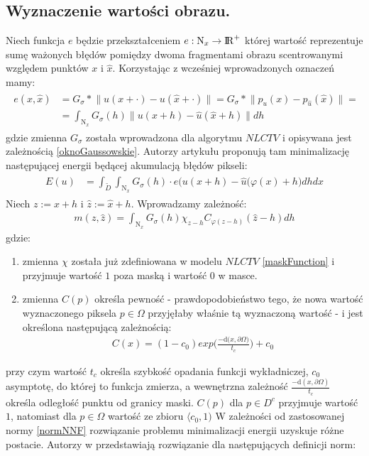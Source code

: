 \documentclass[12pt, twoside, openany]{report}
\theoremstyle{definition}
\begin{document}
\subsection{Wyznaczenie wartości obrazu.}
Niech funkcja $e$  będzie przekształceniem $e: \mathrm{N}_x \rightarrow {\rm I\!R}^{+}$ której wartość reprezentuje sumę ważonych błędów pomiędzy dwoma fragmentami obrazu scentrowanymi względem punktów $x$ i $\hat{x}$. Korzystając z wcześniej wprowadzonych oznaczeń mamy:
\begin{align}
\begin{aligned}
e(x, \hat{x}) &= G_\sigma \ast \big\| u(x + \cdot) - u(\hat{x} + \cdot) \big\| = G_\sigma \ast \big\| p_{u}(x) - p_{\hat{u}}(\hat{x}) \big\| = \\ 
&= \int_{\mathrm{N}_x} G_\sigma(h) \big\| u(x+h) - \hat{u}(\hat{x} +h) \big\|dh
\label{minUs}
\end{aligned}
\end{align}
gdzie zmienna $G_{\sigma}$ została wprowadzona dla algorytmu $NLCTV$ i opisywana jest zależnością \eqref{oknoGaussowskie}. Autorzy artykułu \cite{arias2011variational} proponują tam minimalizację następującej energii będącej akumulacją błędów pikseli:
\begin{align}
\begin{aligned}
E(u) &= \int_{\widetilde D}\int_{\mathrm{N}_x}G_\sigma(h)\cdot e \bigl( u(x+h) - \hat{u}(\varphi(x)+h\bigr)dhdx
\label{patchMatchEnergy}
\end{aligned}
\end{align} 
Niech $z := x+h$ i $\hat{z} := \hat{x}+h$. Wprowadzamy zależność:
\begin{align}
m(z,\hat{z}) = \int_{\mathrm{N}_x}G_\sigma(h)\chi_{z-h}C_{\varphi(z-h)}(\hat{z}-h)dh
\end{align}
gdzie:
\begin{enumerate}
\item
zmienna $\chi$ została już zdefiniowana w modelu $NLCTV$ \eqref{maskFunction} i przyjmuje wartość $1$ poza maską i wartość $0$ w masce.
\item
zmienna $C(p)$ określa pewność - prawdopodobieństwo tego, że nowa wartość wyznaczonego piksela $p \in \Omega$ przyjęłaby właśnie tą wyznaczoną wartość - i jest określona następującą zależnością:
\begin{align}
C(x)=(1-c_0)exp\bigg(\frac{-\mathrm{d}\bigl(x,\partial\Omega\bigr)}{t_c}\bigg) + c_0
\label{pewnoscVFI}
\end{align}
\end{enumerate}
przy czym wartość $t_c$ określa szybkość opadania funkcji wykładniczej, $c_0$ asymptotę, do której to funkcja zmierza, a wewnętrzna zależność $\frac{-\mathrm{d}(x,\partial\Omega)}{t_c}$ określa odległość punktu od granicy maski. $C(p)$ dla $p \in D^c$ przyjmuje wartość $1$, natomiast dla $p \in \Omega$ wartość ze zbioru $\langle c_0,1)$ W zależności od zastosowanej normy \eqref{normNNF} rozwiązanie problemu minimalizacji energii uzyskuje różne postacie. Autorzy w \cite{arias2011variational} przedstawiają rozwiązanie dla następujących definicji norm:
\end{document}
